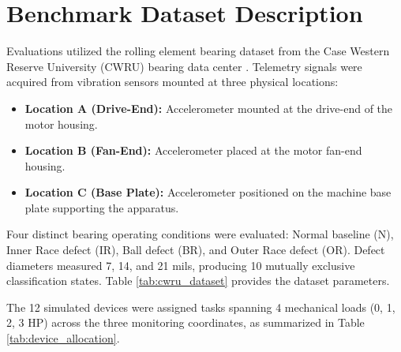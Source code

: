 \documentclass[12pt,a4paper]{report}
\begin{document}
\section{Benchmark Dataset Description}
Evaluations utilized the rolling element bearing dataset from the Case Western Reserve University (CWRU) bearing data center \cite{ref_cwru_dataset}. Telemetry signals were acquired from vibration sensors mounted at three physical locations:
\begin{itemize}
    \item \textbf{Location A (Drive-End):} Accelerometer mounted at the drive-end of the motor housing.
    \item \textbf{Location B (Fan-End):} Accelerometer placed at the motor fan-end housing.
    \item \textbf{Location C (Base Plate):} Accelerometer positioned on the machine base plate supporting the apparatus.
\end{itemize}

Four distinct bearing operating conditions were evaluated: Normal baseline (N), Inner Race defect (IR), Ball defect (BR), and Outer Race defect (OR). Defect diameters measured 7, 14, and 21 mils, producing 10 mutually exclusive classification states. Table \ref{tab:cwru_dataset} provides the dataset parameters.

\begin{table}[htbp]
\centering
\caption{Structural Description of the CWRU Bearing Fault Dataset}
\label{tab:cwru_dataset}
\vspace{0.2cm}
\end{table}

The 12 simulated devices were assigned tasks spanning 4 mechanical loads (0, 1, 2, 3 HP) across the three monitoring coordinates, as summarized in Table \ref{tab:device_allocation}.
\end{document}
